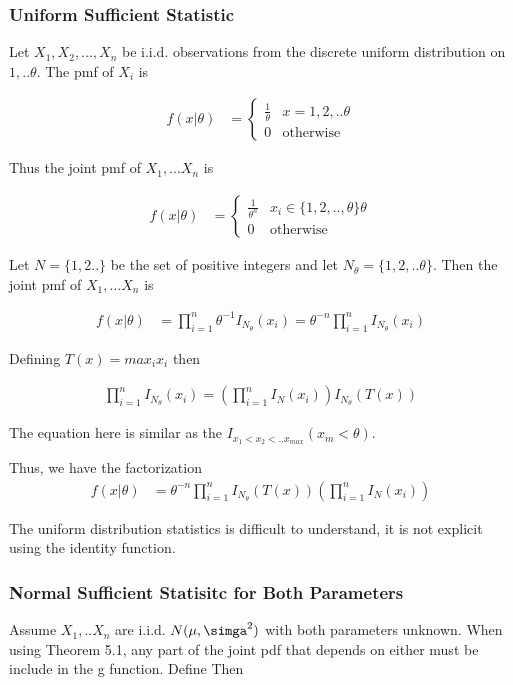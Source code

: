\subsubsection{Uniform Sufficient Statistic}
Let $X_1, X_2,..., X_n$ be i.i.d. observations from the discrete uniform distribution on $1,..\theta$. The pmf of $X_i$ is 

\begin{align*}
	f(x|\theta) &= \begin{cases}
		\frac{1}{\theta} & x=1,2, .. \theta \\
		0 & \text{otherwise}
	\end{cases}
\end{align*}

Thus the joint pmf of $X_1, ...X_n$ is 

\begin{align*}
	f(x|\theta) &= \begin{cases}
		\frac{1}{\theta^n} & x_i \in \{1,2, .., \theta\} \theta \\
		0 & \text{otherwise}
	\end{cases}
\end{align*}

Let $N= \{1,2.. \}$ be the set of positive integers and let $N_{\theta} = \{1,2,.. \theta\}$. Then the joint pmf of $X_1, ... X_n$ is

\begin{align*}
	f(x|\theta) &= \prod_{i=1}^n \theta^{-1} I_{N_{\theta}} (x_i) = \theta^{-n} \prod_{i=1}^n I_{N_{\theta}} (x_i) 
\end{align*}

Defining $T(x) = max_i x_i$ then

\begin{align*}
	\prod_{i=1}^n I_{N_{\theta}} (x_i) = (\prod_{i=1}^n I_{N} (x_i)) I_{N_{\theta}} (T(x))
\end{align*}

The equation here is similar as the $I_{x_1 < x_2 <.. x_{max}} (x_m < \theta)$.

Thus, we have the factorization
\begin{align*}
	f(x|\theta) &= \theta^{-n} \prod_{i=1}^n I_{N_{\theta}} (T(x))  (\prod_{i=1}^n I_{N} (x_i))
\end{align*}

The uniform distribution statistics is difficult to understand, it is not explicit using the identity function. 

\subsubsection{Normal Sufficient Statisitc for Both Parameters}
Assume $X_1,..X_n$ are i.i.d. $N(\mu, \simga^2)$ with both parameters unknown. When using Theorem 5.1, any part of the joint pdf that depends on either must be include in the g function. Define  Then


